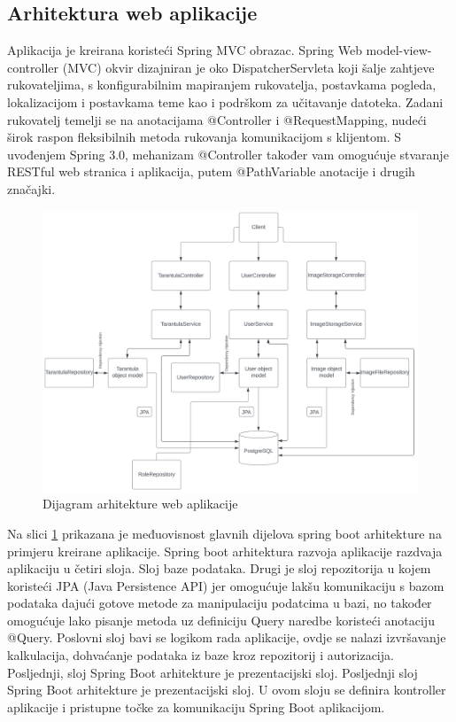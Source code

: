 \documentclass[a4paper,12pt,oneside]{article}
\begin{document}
\subsection{Arhitektura web aplikacije}

Aplikacija je kreirana koristeći Spring MVC obrazac. Spring Web model-view-controller (MVC) okvir dizajniran je oko DispatcherServleta koji šalje zahtjeve rukovateljima, s konfigurabilnim mapiranjem rukovatelja, postavkama pogleda, lokalizacijom i postavkama teme kao i podrškom za učitavanje datoteka. Zadani rukovatelj temelji se na anotacijama @Controller i @RequestMapping, nudeći širok raspon fleksibilnih metoda rukovanja komunikacijom s klijentom. S uvođenjem Spring 3.0, mehanizam @Controller također vam omogućuje stvaranje RESTful web stranica i aplikacija, putem @PathVariable anotacije i drugih značajki.\cite{springMVCUrl} 


\begin{figure}
    \centering
    \includegraphics[width=1\linewidth]{Slike/AppArchitecture.png}
    \caption{Dijagram arhitekture web aplikacije}
    \label{fig:dijagram-arch-apk}
\end{figure}

Na slici \ref{fig:dijagram-arch-apk} prikazana je međuovisnost glavnih dijelova spring boot arhitekture na primjeru kreirane aplikacije. Spring boot arhitektura razvoja aplikacije razdvaja aplikaciju u četiri sloja. Sloj baze podataka. Drugi je sloj repozitorija u kojem koristeći JPA (Java Persistence API) jer omogućuje lakšu komunikaciju s bazom podataka dajući gotove metode za manipulaciju podatcima u bazi, no također omogućuje lako pisanje metoda uz definiciju Query naredbe koristeći anotaciju @Query. Poslovni sloj bavi se logikom rada aplikacije, ovdje se nalazi izvršavanje kalkulacija, dohvaćanje podataka iz baze kroz repozitorij i autorizacija. Posljednji, sloj Spring Boot arhitekture je prezentacijski sloj. Posljednji sloj Spring Boot arhitekture je prezentacijski sloj. U ovom sloju se definira kontroller aplikacije i pristupne točke za komunikaciju Spring Boot aplikacijom. 
\end{document}
